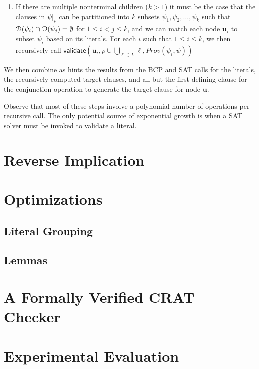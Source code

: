 \documentclass[letterpaper,USenglish,cleveref, autoref, thm-restate]{lipics-v2021}
\newcommand{\lit}{\ell}
\newcommand{\dependencyset}{{\cal D}}
\newcommand{\passign}{\rho}
\newcommand{\validate}{\textsf{validate}}
\newcommand{\makenode}[1]{\mathbf{#1}}
\newcommand{\nodeu}{\makenode{u}}
\newcommand{\simplify}[2]{#1|_{#2}}
\newcommand{\prov}{\mathit{Prov}}
\begin{document}
\begin{enumerate}
\begin{enumerate}
\item If there are multiple nonterminal children ($k > 1$)
  it must be the case that the clauses in
  $\simplify{\psi}{\passign}$ can be partitioned into $k$ subsets
  $\psi_1, \psi_2, \ldots, \psi_k$ such that $\dependencyset(\psi_i)
  \cap \dependencyset(\psi_j) = \emptyset$ for $1 \leq i < j \leq k$,
  and we can match each node $\nodeu_i$ to subset $\psi_i$ based on its
  literals.
  For each $i$ such that $1 \leq i \leq k$, we then recursively call
  $\validate \left(\nodeu_i, \passign \cup \bigcup_{\lit \in L} \lit, \prov(\psi_i, \psi)\right)$
\end{enumerate}
  We then combine as hints the results from the BCP and SAT calls for
  the literals, the recursively computed target clauses, and all but
  the first defining clause for the conjunction operation to generate the target clause for node $\nodeu$.
\end{enumerate}
Observe that most of these steps involve a polynomial number of
operations per recursive call.  The only potential source of
exponential growth is when a SAT solver must be invoked to validate a
literal.

\section{Reverse Implication}



\section{Optimizations}

\subsection{Literal Grouping}

\subsection{Lemmas}
\label{sect:lemma}


\section{A Formally Verified CRAT Checker}

\section{Experimental Evaluation}
\end{document}
